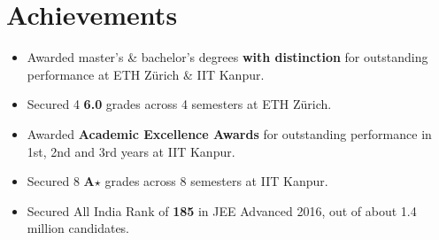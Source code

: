 %

\section*{Achievements}
\begin{itemize}[leftmargin=*,itemsep=0mm,label={\footnotesize\textbullet}]

\item Awarded master's \& bachelor's degrees \textbf{with distinction} for outstanding performance at ETH Zürich \& IIT Kanpur.
\item Secured 4 \textbf{6.0} grades across 4 semesters at ETH Zürich.
\item Awarded \textbf{Academic Excellence Awards} for outstanding performance in 1st, 2nd and 3rd years at IIT Kanpur.
\item Secured 8 \textbf{A$\star$} grades across 8 semesters at IIT Kanpur.
\item Secured All India Rank of \textbf{185} in JEE Advanced 2016, out of about 1.4 million candidates.

\end{itemize}
